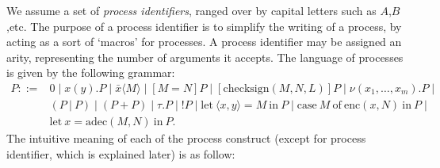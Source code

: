 \documentclass{article}
\begin{document}
We assume a set of {\em process identifiers}, ranged over by capital letters such
as $A$,$B$,etc. The purpose of a process identifier is to simplify the writing of a process,
by acting as a sort of `macros' for processes. 
A process identifier may be assigned an arity, representing the number of arguments it accepts. 
The language of processes is given by the following grammar:
$$
\begin{array}{ll}
P ::= & 0 \mid x(y).P \mid \bar x\langle M \rangle \mid [M = N] P \mid 
[\mathrm{checksign}(M, N, L)] P \mid 
        \nu (x_1,\ldots,x_m). P \mid \\
  & (P ~|~ P) \mid (P + P) \mid \tau.P \mid !P \mid 
 \mathrm{let}~ \langle x, y \rangle = M ~ \mathrm{ in } ~ P
 \mid
\mathrm{case} ~ M ~ \mathrm{ of } ~ \mathrm{enc}(x,N) ~ \mathrm{ in } ~ P \mid
\\
&
\mathrm{let} ~ x = \mathrm{adec}(M, N) ~ \mathrm{ in } ~ P
.
\end{array}
$$
The intuitive meaning of each of the process construct (except for process identifier, which
is explained later) is as follow:
\end{document}
